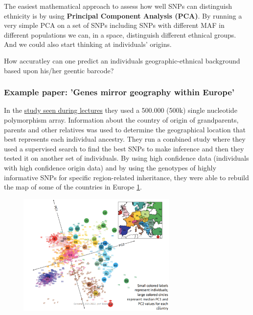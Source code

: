 The easiest mathematical approach to assess how well SNPs can distinguish ethnicity is by using \textbf{Principal Component Analysis (PCA)}. By running a very simple PCA on a set of SNPs including SNPs with different MAF in different populations we can, in a space, distinguish different ethnical groups. And we could also start thinking at individuals' origins. 

How accuratley can one predict an individuals geographic-ethnical background based upon his/her geentic barcode?

\subsubsection{Example paper: 'Genes mirror geography within Europe'}

In the \href{https://www.ncbi.nlm.nih.gov/pmc/articles/PMC2735096/}{study seen during lectures} they used a 500.000 (500k) single nucleotide polymorphism array. Information about the country of origin of grandparents, parents and other relatives was used to determine the geographical location that best represents each individual ancestry. 
They run a combined study where they used a supervised search to find the best SNPs to make inference and then they tested it on another set of individuals. 
By using high confidence data (individuals with high confidence origin data) and by using the genotypes of highly informative SNPs for specific region-related inheritance, they were able to rebuild the map of some of the countries in Europe \ref*{fig:PCA_countries}. 

\begin{figure}
	\centering
	\includegraphics[width=0.7\textwidth]{population.PNG}
	\caption{\label{fig:PCA_countries}}
\end{figure}

